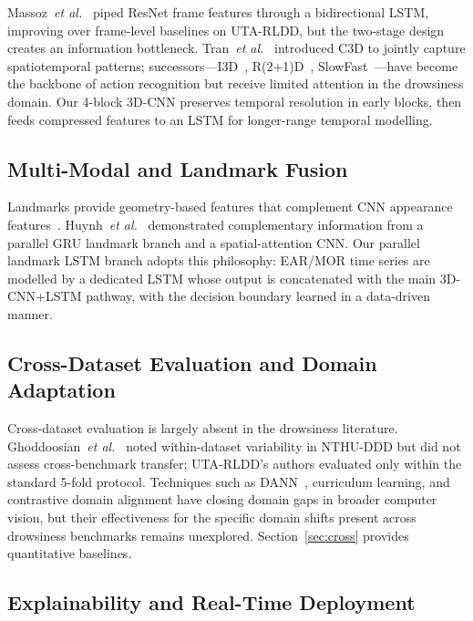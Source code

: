\documentclass[journal]{IEEEtran}
\begin{document}
Massoz~\textit{et al.}~\cite{massoz2018} piped ResNet frame features through a bidirectional LSTM, improving over frame-level baselines on UTA-RLDD, but the two-stage design creates an information bottleneck. Tran~\textit{et al.}~\cite{tran2015} introduced C3D to jointly capture spatiotemporal patterns; successors---I3D~\cite{carreira2017}, R(2+1)D~\cite{tran2018}, SlowFast~\cite{feichtenhofer2019}---have become the backbone of action recognition but receive limited attention in the drowsiness domain. Our 4-block 3D-CNN preserves temporal resolution in early blocks, then feeds compressed features to an LSTM for longer-range temporal modelling.

\subsection{Multi-Modal and Landmark Fusion}
\label{sec:related_fusion}

Landmarks provide geometry-based features that complement CNN appearance features~\cite{raza2021,park2016}. Huynh~\textit{et al.}~\cite{huynh2021} demonstrated complementary information from a parallel GRU landmark branch and a spatial-attention CNN. Our parallel landmark LSTM branch adopts this philosophy: EAR/MOR time series are modelled by a dedicated LSTM whose output is concatenated with the main 3D-CNN+LSTM pathway, with the decision boundary learned in a data-driven manner.

\subsection{Cross-Dataset Evaluation and Domain Adaptation}
\label{sec:related_cross}

Cross-dataset evaluation is largely absent in the drowsiness literature. Ghoddoosian~\textit{et al.}~\cite{ghoddoosian2019} noted within-dataset variability in NTHU-DDD but did not assess cross-benchmark transfer; UTA-RLDD's authors evaluated only within the standard 5-fold protocol. Techniques such as DANN~\cite{ganin2016}, curriculum learning, and contrastive domain alignment have closing domain gaps in broader computer vision, but their effectiveness for the specific domain shifts present across drowsiness benchmarks remains unexplored. Section~\ref{sec:cross} provides quantitative baselines.

\subsection{Explainability and Real-Time Deployment}
\label{sec:related_xai}
\end{document}
